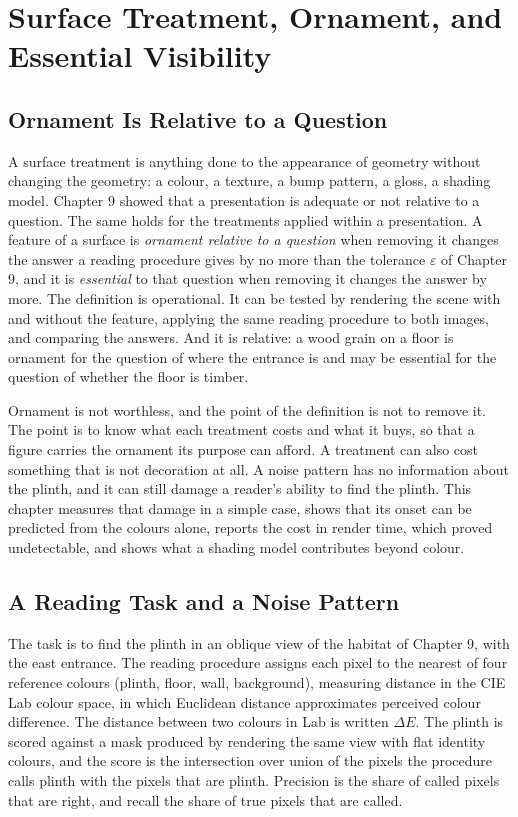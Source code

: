 \chapter{Surface Treatment, Ornament, and Essential Visibility}

\section{Ornament Is Relative to a Question}

A surface treatment is anything done to the appearance of geometry without changing the geometry: a colour, a texture, a bump pattern, a gloss, a shading model. Chapter 9 showed that a presentation is adequate or not relative to a question. The same holds for the treatments applied within a presentation. A feature of a surface is \emph{ornament relative to a question} when removing it changes the answer a reading procedure gives by no more than the tolerance $\varepsilon$ of Chapter 9, and it is \emph{essential} to that question when removing it changes the answer by more. The definition is operational. It can be tested by rendering the scene with and without the feature, applying the same reading procedure to both images, and comparing the answers. And it is relative: a wood grain on a floor is ornament for the question of where the entrance is and may be essential for the question of whether the floor is timber.

Ornament is not worthless, and the point of the definition is not to remove it. The point is to know what each treatment costs and what it buys, so that a figure carries the ornament its purpose can afford. A treatment can also cost something that is not decoration at all. A noise pattern has no information about the plinth, and it can still damage a reader's ability to find the plinth. This chapter measures that damage in a simple case, shows that its onset can be predicted from the colours alone, reports the cost in render time, which proved undetectable, and shows what a shading model contributes beyond colour.

\section{A Reading Task and a Noise Pattern}

The task is to find the plinth in an oblique view of the habitat of Chapter 9, with the east entrance. The reading procedure assigns each pixel to the nearest of four reference colours (plinth, floor, wall, background), measuring distance in the CIE Lab colour space, in which Euclidean distance approximates perceived colour difference. The distance between two colours in Lab is written $\Delta E$. The plinth is scored against a mask produced by rendering the same view with flat identity colours, and the score is the intersection over union of the pixels the procedure calls plinth with the pixels that are plinth. Precision is the share of called pixels that are right, and recall the share of true pixels that are called.

